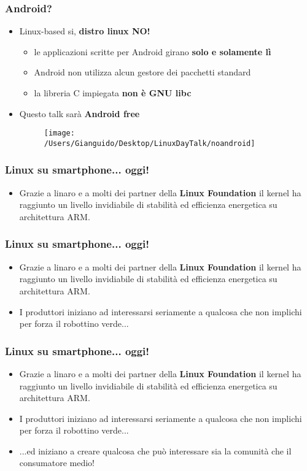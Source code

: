 \documentclass[12pt]{beamer}
\begin{document}
\begin{frame}
\frametitle{Android?}
\begin{itemize}
\item Linux-based si, \textbf{distro linux NO!}
\begin{itemize}
\item le applicazioni scritte per Android girano \textbf{solo e solamente lì}
\item Android non utilizza alcun gestore dei pacchetti standard
\item la libreria C impiegata \textbf{non è GNU libc}
\end{itemize}
\item Questo talk sarà \textbf{Android free}
\begin{figure}[h]
\centering
\texttt{[image: /Users/Gianguido/Desktop/LinuxDayTalk/noandroid]}
\end{figure}
\end{itemize}
\end{frame}


\begin{frame}
\frametitle{Linux su smartphone... oggi!}
\begin{itemize}
\item Grazie a linaro e a molti dei partner della \textbf{Linux Foundation} il kernel ha raggiunto un livello invidiabile di stabilità ed efficienza energetica su architettura ARM.
\end{itemize}
\end{frame}

\begin{frame}
\frametitle{Linux su smartphone... oggi!}
\begin{itemize}
\item Grazie a linaro e a molti dei partner della \textbf{Linux Foundation} il kernel ha raggiunto un livello invidiabile di stabilità ed efficienza energetica su architettura ARM.
\item I produttori iniziano ad interessarsi seriamente a qualcosa che non implichi per forza il robottino verde...
\end{itemize}
\end{frame}

\begin{frame}
\frametitle{Linux su smartphone... oggi!}
\begin{itemize}
\item Grazie a linaro e a molti dei partner della \textbf{Linux Foundation} il kernel ha raggiunto un livello invidiabile di stabilità ed efficienza energetica su architettura ARM.
\item I produttori iniziano ad interessarsi seriamente a qualcosa che non implichi per forza il robottino verde...
\item ...ed iniziano a creare qualcosa che può interessare sia la comunità che il consumatore medio!
\end{itemize}
\end{frame}
\end{document}
